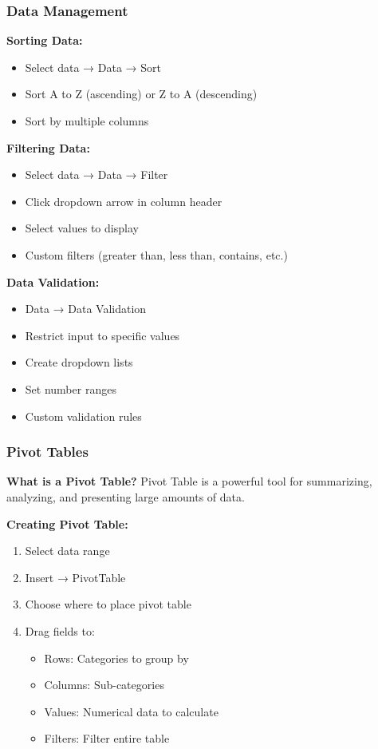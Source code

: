 \documentclass[12pt,a4paper]{article}
\begin{document}
\subsubsection{Data Management}

\textbf{Sorting Data:}
\begin{itemize}
    \item Select data → Data → Sort
    \item Sort A to Z (ascending) or Z to A (descending)
    \item Sort by multiple columns
\end{itemize}

\textbf{Filtering Data:}
\begin{itemize}
    \item Select data → Data → Filter
    \item Click dropdown arrow in column header
    \item Select values to display
    \item Custom filters (greater than, less than, contains, etc.)
\end{itemize}

\textbf{Data Validation:}
\begin{itemize}
    \item Data → Data Validation
    \item Restrict input to specific values
    \item Create dropdown lists
    \item Set number ranges
    \item Custom validation rules
\end{itemize}

\subsubsection{Pivot Tables}

\textbf{What is a Pivot Table?}
Pivot Table is a powerful tool for summarizing, analyzing, and presenting large amounts of data.

\textbf{Creating Pivot Table:}
\begin{enumerate}
    \item Select data range
    \item Insert → PivotTable
    \item Choose where to place pivot table
    \item Drag fields to:
    \begin{itemize}
        \item Rows: Categories to group by
        \item Columns: Sub-categories
        \item Values: Numerical data to calculate
        \item Filters: Filter entire table
    \end{itemize}
\end{enumerate}
\end{document}
